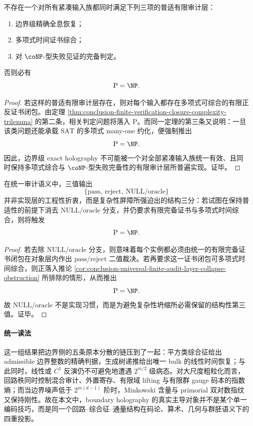 \begin{corollary}[普适有限审计层的复杂性坍缩障碍]\label{cor:conclusion-universal-finite-audit-layer-collapse-obstruction}
不存在一个对所有紧凑输入族都同时满足下列三项的普适有限审计层：
\begin{enumerate}
  \item 边界级精确全息恢复；
  \item 多项式时间证书综合；
  \item 对 \(\coNP\)-型失败见证的完备判定。
\end{enumerate}
否则必有
\[
\mathrm P=\NP.
\]
\end{corollary}
\begin{proof}
若这样的普适有限审计层存在，则对每个输入都存在多项式可综合的有限正反证书闭包。由定理 \ref{thm:conclusion-finite-verification-closure-complexity-trilemma} 的第二条，相关判定问题将落入 \(\mathrm P\)。而同一定理的第三条又说明：一旦该类问题还能承载 \(\mathrm{SAT}\) 的多项式 many-one 约化，便强制推出
\[
\mathrm P=\NP.
\]
因此，边界级 exact holography 不可能被一个对全部紧凑输入族统一有效、且同时保持多项式综合与 \(\coNP\)-型失败完备性的有限审计层所普遍实现。证毕。
\end{proof}

\begin{corollary}\label{cor:conclusion-null-reject-oracle-trichotomy-structural}
在统一审计语义中，三值输出
\[
\{\mathrm{pass},\ \mathrm{reject},\ \mathrm{NULL/oracle}\}
\]
并非实现层的工程性折衷，而是复杂性屏障所强迫出的结构三分：若试图在保持普适性的前提下消去 \(\mathrm{NULL/oracle}\) 分支，并仍要求有限完备证书与多项式时间综合，则将触发
\[
\mathrm P=\NP.
\]
\end{corollary}
\begin{proof}
若去除 \(\mathrm{NULL/oracle}\) 分支，则意味着每个实例都必须由统一的有限完备证书闭包在对象层内作出 \(\mathrm{pass}/\mathrm{reject}\) 二值裁决。若再要求这一证书闭包可多项式时间综合，则正落入推论 \ref{cor:conclusion-universal-finite-audit-layer-collapse-obstruction} 所排除的情形，从而推出
\[
\mathrm P=\NP.
\]
故 \(\mathrm{NULL/oracle}\) 不是实现习惯，而是为避免复杂性坍缩所必需保留的结构性第三值。证毕。
\end{proof}

\paragraph{统一读法}
这一组结果把边界侧的五条原本分散的链压到了一起：平方类综合征给出 admissible 边界整数的精确判据，生成树递推给出唯一 bulk 的线性时间恢复；与此同时，线性或 \(C^1\) 反演仍不可避免地遭遇 \(2^{m/2}\) 级病态。对大尺度粗粒化而言，回路秩同时控制混合审计、外置寄存、有限域 lifting 与有限群 gauge 码本的指数熵；而当边界噪声低于 \(2^{m(d-1)}\) 阶时，Minkowski 含量与 primorial 双对数指纹又保持刚性。故在本文中，boundary holography 的真实主导对象并不是某个单一编码技巧，而是同一个回路--综合征--通量结构在码论、算术、几何与群胚语义下的四重投影。

\endinput
